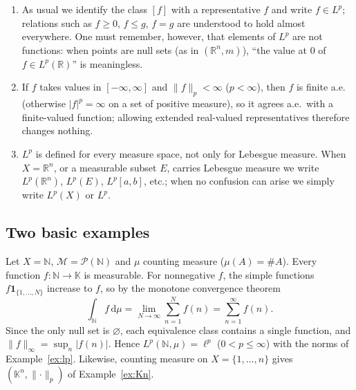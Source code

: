 \documentclass[11pt]{article}
\newcommand{\K}{\mathbb{K}}
\newcommand{\R}{\mathbb{R}}
\newcommand{\N}{\mathbb{N}}
\newcommand{\M}{\mathcal{M}}
\newcommand{\norm}[1]{\lVert #1\rVert}
\newcommand{\dmu}{\,\mathrm{d}\mu}
\newcommand{\ind}{\mathbf{1}}
\begin{document}
\begin{remark}[Conventions]\label{rem:convention}
\begin{enumerate}
\item As usual we identify the class $[f]$ with a representative $f$ and write $f\in L^{p}$; relations such as $f\ge0$, $f\le g$, $f=g$ are understood to hold almost everywhere. One must remember, however, that elements of $L^{p}$ are not functions: when points are null sets (as in $(\R^{n},m)$), ``the value at $0$ of $f\in L^{p}(\R)$'' is meaningless.
\item If $f$ takes values in $[-\infty,\infty]$ and $\norm{f}_{p}<\infty$ ($p<\infty$), then $f$ is finite a.e. (otherwise $|f|^{p}=\infty$ on a set of positive measure), so it agrees a.e.\ with a finite-valued function; allowing extended real-valued representatives therefore changes nothing.
\item $L^{p}$ is defined for every measure space, not only for Lebesgue measure. When $X=\R^{n}$, or a measurable subset $E$, carries Lebesgue measure we write $L^{p}(\R^{n})$, $L^{p}(E)$, $L^{p}[a,b]$, etc.; when no confusion can arise we simply write $L^{p}(X)$ or $L^{p}$.
\end{enumerate}
\end{remark}

\subsection{Two basic examples}

\begin{example}\label{ex:counting}
Let $X=\N$, $\M=\mathcal{P}(\N)$ and $\mu$ counting measure ($\mu(A)=\#A$). Every function $f:\N\to\K$ is measurable. For nonnegative $f$, the simple functions $f\ind_{\{1,\dots,N\}}$ increase to $f$, so by the monotone convergence theorem
\[
\int_{\N}f\dmu=\lim_{N\to\infty}\sum_{n=1}^{N}f(n)=\sum_{n=1}^{\infty}f(n).
\]
Since the only null set is $\varnothing$, each equivalence class contains a single function, and $\norm{f}_{\infty}=\sup_{n}|f(n)|$. Hence $L^{p}(\N,\mu)=\ell^{p}$ ($0<p\le\infty$) with the norms of Example~\ref{ex:lp}. Likewise, counting measure on $X=\{1,\dots,n\}$ gives $(\K^{n},\norm{\cdot}_{p})$ of Example~\ref{ex:Kn}.
\end{example}
\end{document}
